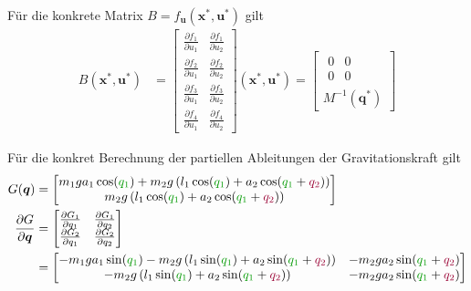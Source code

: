\documentclass[a4paper, 12pt]{scrartcl}
\newcommand{\gruen}[2][gruen]{\textcolor{#1}{#2}}
\newcommand{\dunkelrot}[2][dunkelrot]{\textcolor{#1}{#2}}
\begin{document}
Für die konkrete Matrix $B = f_{\bm{u}}(\bm{x}^*, \bm{u}^*)$ gilt
\begin{align*}
    B(\bm{x}^*, \bm{u}^*)
    &=
    \begin{bmatrix}
        \frac{\partial f_1}{\partial u_1}  
        & \frac{\partial f_1}{\partial u_2}  
        \\ \frac{\partial f_2}{\partial u_1} 
        & \frac{\partial f_2}{\partial u_2} 
        \\ \frac{\partial f_3}{\partial u_1} 
        & \frac{\partial f_3}{\partial u_2} 
        \\ \frac{\partial f_4}{\partial u_1} 
        & \frac{\partial f_4}{\partial u_2} 
    \end{bmatrix}(\bm{x}^*, \bm{u}^*) 
    =  
    \begin{bmatrix}
        \begin{matrix}
            0 & 0 \\
            0 & 0
        \end{matrix}
        \\[12pt]
        M^{-1}(\bm{q}^*)
    \end{bmatrix}   
\end{align*}

Für die konkret Berechnung der partiellen Ableitungen der Gravitationskraft gilt
\begin{align*}
    G(\bm{q}) &=
    \begin{bmatrix}
        m_1  g  a_1 \cos(\gruen{q_1}) + m_2  g \left( l_1 \cos(\gruen{q_1}) 
        + a_2 \cos(\gruen{q_1} + \dunkelrot{q_2}) \right) \\
        m_2  g \left( l_1 \cos(\gruen{q_1}) + a_2 \cos(\gruen{q_1} + \dunkelrot{q_2}) \right)
    \end{bmatrix}
    \\
    \frac{\partial G}{\partial \bm{q}}
    &=
    \begin{bmatrix}
        \frac{\partial G_1}{\partial q_1}
        & \frac{\partial G_1}{\partial q_2} \\
        \frac{\partial G_2}{\partial q_1}
        & \frac{\partial G_2}{\partial q_2}
    \end{bmatrix} \\
    &=
    \begin{bmatrix}
        - m_1 g a_1 \sin(\gruen{q_1}) 
        - m_2 g \left( l_1 \sin(\gruen{q_1}) + a_2 \sin(\gruen{q_1} + \dunkelrot{q_2}) \right)
        & - m_2 g a_2 \sin(\gruen{q_1} + \dunkelrot{q_2}) \\
        - m_2 g \left( l_1 \sin(\gruen{q_1}) + a_2 \sin(\gruen{q_1} + \dunkelrot{q_2}) \right)
        & - m_2 g a_2 \sin(\gruen{q_1} + \dunkelrot{q_2})
    \end{bmatrix}
\end{align*}
\end{document}
